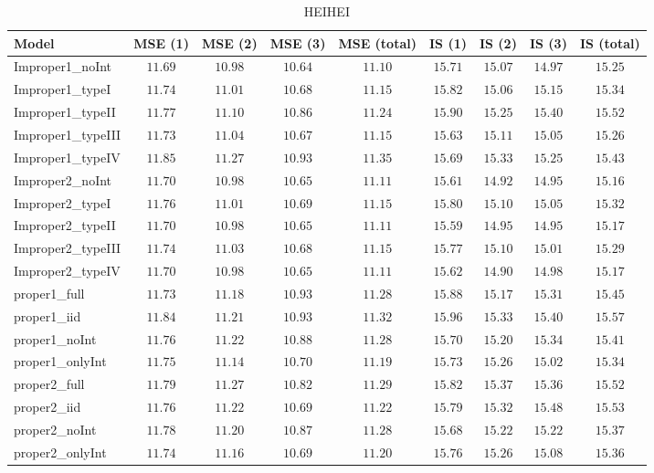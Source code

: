 \begin{table}

\caption{\label{tab:model-choice-sc7}HEIHEI}
\centering
\begin{tabular}{lcccccccc}
\hline
Model  & MSE (1) & MSE (2) & MSE (3) & MSE (total) & IS (1) & IS (2) & IS (3) & \multicolumn{1}{c}{IS (total)} \\ 
\hline
Improper1_noInt  & $11.69$ & $10.98$ & $10.64$ & $11.10$ & $15.71$ & $15.07$ & $14.97$ & $15.25$ \\
Improper1_typeI  & $11.74$ & $11.01$ & $10.68$ & $11.15$ & $15.82$ & $15.06$ & $15.15$ & $15.34$ \\
Improper1_typeII  & $11.77$ & $11.10$ & $10.86$ & $11.24$ & $15.90$ & $15.25$ & $15.40$ & $15.52$ \\
Improper1_typeIII  & $11.73$ & $11.04$ & $10.67$ & $11.15$ & $15.63$ & $15.11$ & $15.05$ & $15.26$ \\
Improper1_typeIV  & $11.85$ & $11.27$ & $10.93$ & $11.35$ & $15.69$ & $15.33$ & $15.25$ & $15.43$ \\
Improper2_noInt  & $11.70$ & $10.98$ & $10.65$ & $11.11$ & $15.61$ & $14.92$ & $14.95$ & $15.16$ \\
Improper2_typeI  & $11.76$ & $11.01$ & $10.69$ & $11.15$ & $15.80$ & $15.10$ & $15.05$ & $15.32$ \\
Improper2_typeII  & $11.70$ & $10.98$ & $10.65$ & $11.11$ & $15.59$ & $14.95$ & $14.95$ & $15.17$ \\
Improper2_typeIII  & $11.74$ & $11.03$ & $10.68$ & $11.15$ & $15.77$ & $15.10$ & $15.01$ & $15.29$ \\
Improper2_typeIV  & $11.70$ & $10.98$ & $10.65$ & $11.11$ & $15.62$ & $14.90$ & $14.98$ & $15.17$ \\
proper1_full  & $11.73$ & $11.18$ & $10.93$ & $11.28$ & $15.88$ & $15.17$ & $15.31$ & $15.45$ \\
proper1_iid  & $11.84$ & $11.21$ & $10.93$ & $11.32$ & $15.96$ & $15.33$ & $15.40$ & $15.57$ \\
proper1_noInt  & $11.76$ & $11.22$ & $10.88$ & $11.28$ & $15.70$ & $15.20$ & $15.34$ & $15.41$ \\
proper1_onlyInt  & $11.75$ & $11.14$ & $10.70$ & $11.19$ & $15.73$ & $15.26$ & $15.02$ & $15.34$ \\
proper2_full  & $11.79$ & $11.27$ & $10.82$ & $11.29$ & $15.82$ & $15.37$ & $15.36$ & $15.52$ \\
proper2_iid  & $11.76$ & $11.22$ & $10.69$ & $11.22$ & $15.79$ & $15.32$ & $15.48$ & $15.53$ \\
proper2_noInt  & $11.78$ & $11.20$ & $10.87$ & $11.28$ & $15.68$ & $15.22$ & $15.22$ & $15.37$ \\
proper2_onlyInt  & $11.74$ & $11.16$ & $10.69$ & $11.20$ & $15.76$ & $15.26$ & $15.08$ & $15.36$ \\
\hline 
\end{tabular}

\end{table}